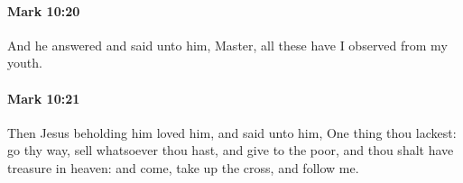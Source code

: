 		\paragraph{Mark 10:20} %
			\label{MARK-10-20}

			And he answered and said unto him, Master, all these have I observed from my youth.

			\begin{framed}
			\scriptsize
				\begin{compactdesc}
					\item[SBLG] 
				\end{compactdesc}
			\end{framed}

		\paragraph{Mark 10:21} %
			\label{MARK-10-21}

			Then Jesus beholding him loved him, and said unto him, One thing thou lackest: go thy way, sell whatsoever thou hast, and give to the poor, and thou shalt have treasure in heaven: and come, take up the cross, and follow me.

